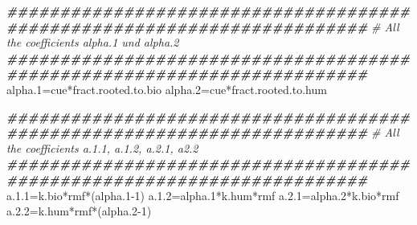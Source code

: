 \documentclass[
  10pt,
  b5paper,
]{book}
\newenvironment{Shaded}{\begin{snugshade}}{\end{snugshade}}
\newcommand{\CommentTok}[1]{\textcolor[rgb]{0.56,0.35,0.01}{\textit{#1}}}
\newcommand{\DecValTok}[1]{\textcolor[rgb]{0.00,0.00,0.81}{#1}}
\newcommand{\DocumentationTok}[1]{\textcolor[rgb]{0.56,0.35,0.01}{\textbf{\textit{#1}}}}
\newcommand{\FloatTok}[1]{\textcolor[rgb]{0.00,0.00,0.81}{#1}}
\newcommand{\NormalTok}[1]{#1}
\newcommand{\OtherTok}[1]{\textcolor[rgb]{0.56,0.35,0.01}{#1}}
\newcommand{\SpecialCharTok}[1]{\textcolor[rgb]{0.00,0.00,0.00}{#1}}
\begin{document}
\begin{Shaded}
\begin{Highlighting}[]
\DocumentationTok{\#\#\#\#\#\#\#\#\#\#\#\#\#\#\#\#\#\#\#\#\#\#\#\#\#\#\#\#\#\#\#\#\#\#\#\#\#\#\#\#\#\#\#\#\#\#\#\#\#\#\#\#\#\#\#\#\#\#\#\#\#\#\#\#\#\#\#\#\#\#\#\#}
  \CommentTok{\# All the coefficients alpha.1 und alpha.2}
  \DocumentationTok{\#\#\#\#\#\#\#\#\#\#\#\#\#\#\#\#\#\#\#\#\#\#\#\#\#\#\#\#\#\#\#\#\#\#\#\#\#\#\#\#\#\#\#\#\#\#\#\#\#\#\#\#\#\#\#\#\#\#\#\#\#\#\#\#\#\#\#\#\#\#\#\#}
\NormalTok{  alpha}\FloatTok{.1}\OtherTok{=}\NormalTok{cue}\SpecialCharTok{*}\NormalTok{fract.rooted.to.bio}
\NormalTok{  alpha}\FloatTok{.2}\OtherTok{=}\NormalTok{cue}\SpecialCharTok{*}\NormalTok{fract.rooted.to.hum}
  
  \DocumentationTok{\#\#\#\#\#\#\#\#\#\#\#\#\#\#\#\#\#\#\#\#\#\#\#\#\#\#\#\#\#\#\#\#\#\#\#\#\#\#\#\#\#\#\#\#\#\#\#\#\#\#\#\#\#\#\#\#\#\#\#\#\#\#\#\#\#\#\#\#\#\#\#\#}
  \CommentTok{\# All the coefficients a.1.1, a.1.2, a.2.1, a2.2}
  \DocumentationTok{\#\#\#\#\#\#\#\#\#\#\#\#\#\#\#\#\#\#\#\#\#\#\#\#\#\#\#\#\#\#\#\#\#\#\#\#\#\#\#\#\#\#\#\#\#\#\#\#\#\#\#\#\#\#\#\#\#\#\#\#\#\#\#\#\#\#\#\#\#\#\#\#}
\NormalTok{  a.}\FloatTok{1.1}\OtherTok{=}\NormalTok{k.bio}\SpecialCharTok{*}\NormalTok{rmf}\SpecialCharTok{*}\NormalTok{(alpha}\FloatTok{.1}\DecValTok{{-}1}\NormalTok{)}
\NormalTok{  a.}\FloatTok{1.2}\OtherTok{=}\NormalTok{alpha}\FloatTok{.1}\SpecialCharTok{*}\NormalTok{k.hum}\SpecialCharTok{*}\NormalTok{rmf}
\NormalTok{  a.}\FloatTok{2.1}\OtherTok{=}\NormalTok{alpha}\FloatTok{.2}\SpecialCharTok{*}\NormalTok{k.bio}\SpecialCharTok{*}\NormalTok{rmf}
\NormalTok{  a.}\FloatTok{2.2}\OtherTok{=}\NormalTok{k.hum}\SpecialCharTok{*}\NormalTok{rmf}\SpecialCharTok{*}\NormalTok{(alpha}\FloatTok{.2}\DecValTok{{-}1}\NormalTok{)}
  

\end{Highlighting}
\end{Shaded}
\end{document}
